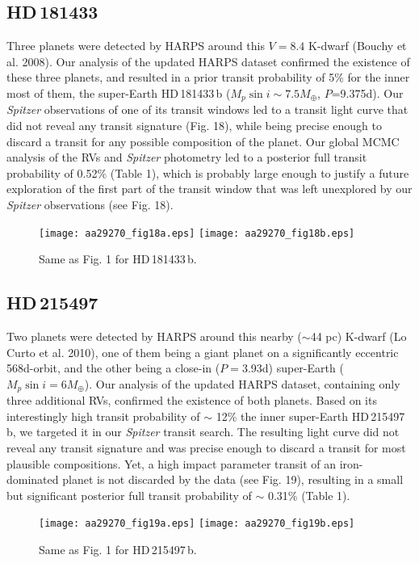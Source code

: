 \documentclass[traditabstract]{aa}
\begin{document}
\subsection{HD\,181433}
Three planets were detected by HARPS around this $V=8.4$ K-dwarf (Bouchy et al. 2008). Our analysis of the updated HARPS dataset confirmed the existence of these three planets, and resulted in a prior transit probability of 5\% for the inner most of them, the super-Earth HD\,181433\,b ($M_p \sin i \sim 7.5 M_\oplus$, $P$=9.375d). Our {\it Spitzer} observations of one of its transit windows led to a transit light curve that did not reveal any transit signature (Fig. 18), while being precise enough to discard a transit for any possible composition of the planet. Our global MCMC analysis of the RVs and {\it Spitzer} photometry led to a posterior full transit probability of 0.52\% (Table 1), which is probably large enough to justify a future exploration of the first part of the transit window that was left unexplored by our {\it Spitzer} observations (see Fig. 18).

\begin{figure}
\label{fig:20}
\centering                     
\texttt{[image: aa29270\_fig18a.eps]}
\texttt{[image: aa29270\_fig18b.eps]}
\caption{Same as Fig. 1 for  HD\,181433\,b.}
\end{figure} 

\subsection{HD\,215497}

Two planets were detected by HARPS around this nearby ($\sim$44 pc) K-dwarf  (Lo Curto et al. 2010), one of them being a giant planet on a significantly eccentric 568d-orbit, and the other being a close-in ($P=$3.93d) super-Earth ($M_p \sin i = 6 M_\oplus$). Our analysis of the updated HARPS dataset, containing only three additional RVs, confirmed the existence of both planets. Based on its interestingly high transit probability of $\sim$ 12\% the inner super-Earth HD\,215497\,b, we targeted it in our {\it Spitzer} transit search. The resulting light curve did not reveal any transit signature and was precise enough to discard a transit for most plausible compositions. Yet, a high impact parameter transit of an iron-dominated planet is not discarded by the data (see Fig. 19), resulting in a small but significant posterior full transit probability of $\sim$ 0.31\% (Table 1). 

\begin{figure}
\label{fig:21}
\centering                     
\texttt{[image: aa29270\_fig19a.eps]}
\texttt{[image: aa29270\_fig19b.eps]}
\caption{Same as Fig. 1 for HD\,215497\,b.}
\end{figure} 
\end{document}
